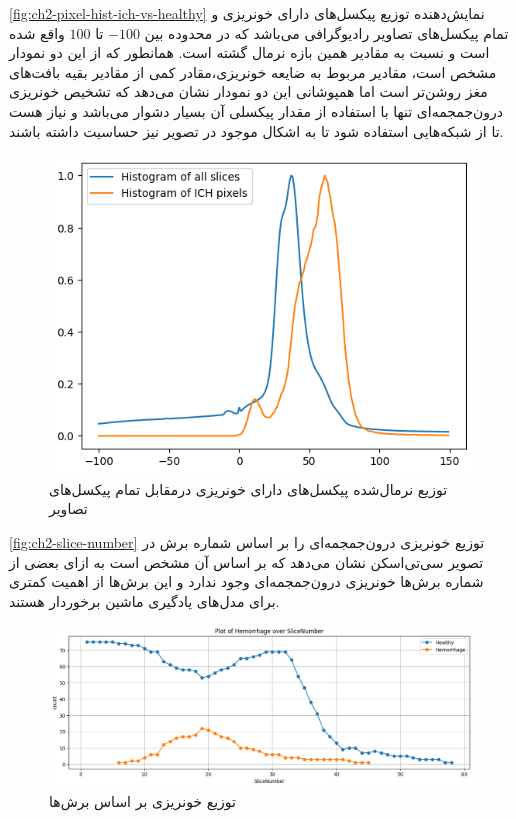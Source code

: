 \autoref{fig:ch2-pixel-hist-ich-vs-healthy}
نمایش‌دهنده توزیع پیکسل‌های دارای خونریزی و تمام پیکسل‌های تصاویر رادیوگرافی می‌باشد که در محدوده بین 
$-100$
تا 
$100$
واقع شده است و نسبت به مقادیر همین بازه نرمال گشته است. همانطور که از این دو نمودار مشخص است، مقادیر مربوط به ضایعه خونریزی،‌مقادر کمی از مقادیر بقیه بافت‌های مغز روشن‌تر است اما همپوشانی این دو نمودار نشان می‌دهد که تشخیص خونریزی درون‌جمجمه‌ای تنها با استفاده از مقدار پیکسلی آن بسیار دشوار می‌باشد و نیاز هست تا از شبکه‌هایی استفاده شود تا به اشکال موجود در تصویر نیز حساسیت داشته باشند.


\begin{figure}[H]
\centering
\includegraphics[width=1.0\linewidth]{"Images/Chapter2/pixel hist ich vs healthy"}
\caption{توزیع نرمال‌شده پیکسل‌های دارای خونریزی درمقابل تمام پیکسل‌های تصاویر}
\label{fig:ch2-pixel-hist-ich-vs-healthy}
\end{figure}


\autoref{fig:ch2-slice-number}
توزیع خونریزی درون‌جمجمه‌ای را بر اساس شماره برش در تصویر سی‌تی‌اسکن نشان می‌دهد که بر اساس آن مشخص است به ازای بعضی از شماره برش‌ها خونریزی درون‌جمجمه‌ای وجود ندارد و این برش‌ها از اهمیت کمتری برای مدل‌های یادگیری ماشین برخوردار هستند.

\begin{figure}[H]
\centering
\includegraphics[width=1.0\linewidth]{"Images/Chapter2/slice hist"}
\caption{توزیع خونریزی بر اساس برش‌ها}
\label{fig:ch2-slice-hist}
\end{figure}


